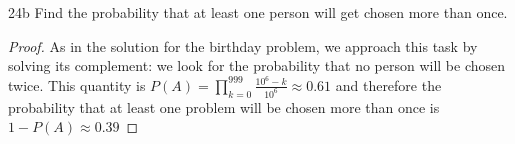 \begin{exercise}{24b}
Find the probability that at least one person will get chosen more than once.
\end{exercise}

\begin{proof}
    As in the solution for the birthday problem, we approach this task by solving its complement: we look for the probability that no person will be chosen twice. This quantity is $P(A) = \prod_{k=0}^{999} \frac{10^6-k}{10^6} \approx 0.61$ and therefore the probability that at least one problem will be chosen more than once is $1-P(A)\approx 0.39$
\end{proof}


